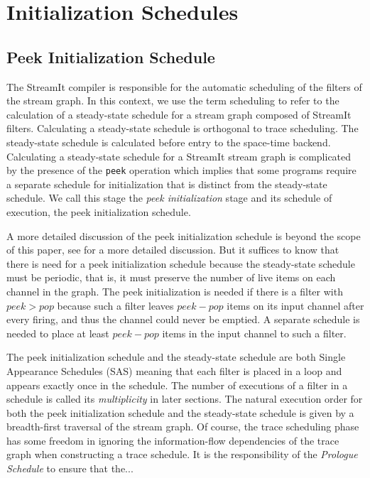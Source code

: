\section{Initialization Schedules}
\subsection{Peek Initialization Schedule}
The StreamIt compiler is responsible for the automatic scheduling of
the filters of the stream graph. In this context, we use the term
scheduling to refer to the calculation of a steady-state schedule for
a stream graph composed of StreamIt filters.  Calculating a
steady-state schedule is orthogonal to trace scheduling. The
steady-state schedule is calculated before entry to the space-time
backend.  Calculating a steady-state schedule for a StreamIt stream
graph is complicated by the presence of the {\tt peek} operation which
implies that some programs require a separate schedule for
initialization that is distinct from the steady-state schedule.  We
call this stage the {\it peek initialization} stage and its schedule
of execution, the {peek initialization schedule}.

A more detailed discussion of the peek initialization schedule is
beyond the scope of this paper, see \cite{streamitcc} for a more
detailed discussion.  But it suffices to know that there is
need for a peek initialization schedule because the steady-state schedule
must be periodic, that is, it must preserve the number of live items on
each channel in the graph.  The peek initialization is needed if there
is a filter with $peek > pop$ because such a filter leaves $peek -
pop$ items on its input channel after every firing, and thus the
channel could never be emptied.  A separate schedule is needed to
place at least $peek - pop$ items in the input channel to such a filter.

The peek initialization schedule and the steady-state schedule are
both Single Appearance Schedules (SAS) meaning that each filter is
placed in a loop and appears exactly once in the schedule.  The number
of executions of a filter in a schedule is called its {\it
multiplicity} in later sections.  The natural execution order for both
the peek initialization schedule and the steady-state schedule is
given by a breadth-first traversal of the stream graph. Of course, the
trace scheduling phase has some freedom in ignoring the
information-flow dependencies of the trace graph when constructing a
trace schedule.  It is the responsibility of the {\it Prologue
Schedule} to ensure that the...

